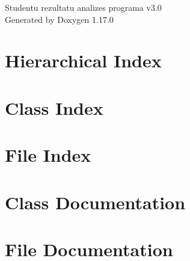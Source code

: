 \documentclass[twoside]{book}
\newcommand{\+}{\discretionary{\mbox{\scriptsize$\hookleftarrow$}}{}{}}
\newcommand{\clearemptydoublepage}{%
    \newpage{\pagestyle{empty}\cleardoublepage}%
  }
\begin{document}
  \raggedbottom
    \hypersetup{pageanchor=false,
                bookmarksnumbered=true,
                pdfencoding=unicode
               }
  \begin{titlepage}
  \vspace*{7cm}
  \begin{center}%
  {\Large Studentu rezultatu analizes programa v3.\+0}\\
  \vspace*{1cm}
  {\large Generated by Doxygen 1.17.0}\\
  \end{center}
  \end{titlepage}
  \clearemptydoublepage
  \tableofcontents
  \clearemptydoublepage
  \hypersetup{pageanchor=true}
\chapter{Hierarchical Index}

\chapter{Class Index}

\chapter{File Index}

\chapter{Class Documentation}




\chapter{File Documentation}














  \backmatter
  \newpage
  \clearemptydoublepage
  \printindex
\end{document}
